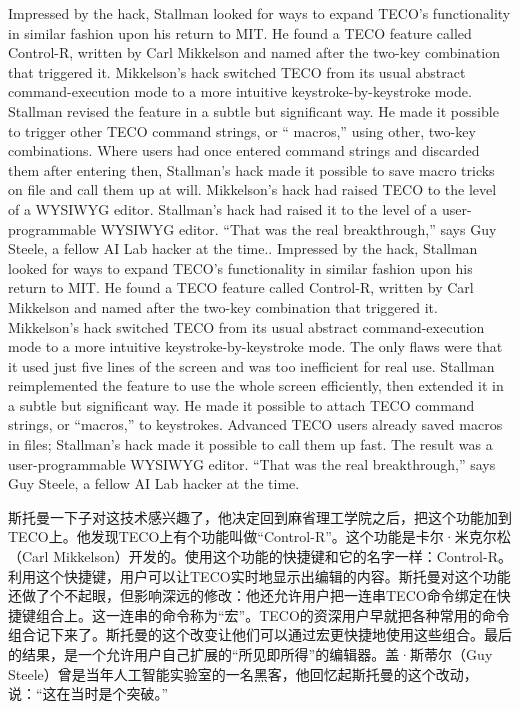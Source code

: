 \ifdefined\eng
\ifdefined\vone
Impressed by the hack, Stallman looked for ways to expand TECO's functionality in similar fashion upon his return to MIT. He found a TECO feature called Control-R, written by Carl Mikkelson and named after the two-key combination that triggered it. Mikkelson's hack switched TECO from its usual abstract command-execution mode to a more intuitive keystroke-by-keystroke mode. Stallman revised the feature in a subtle but significant way. He made it possible to trigger other TECO command strings, or `` macros,'' using other, two-key combinations. Where users had once entered command strings and discarded them after entering then, Stallman's hack made it possible to save macro tricks on file and call them up at will. Mikkelson's hack had raised TECO to the level of a WYSIWYG editor. Stallman's hack had raised it to the level of a user-programmable WYSIWYG editor. ``That was the real breakthrough,'' says Guy Steele, a fellow AI Lab hacker at the time..
\fi
\ifdefined\vtwo
Impressed by the hack, Stallman looked for ways to expand TECO's functionality in similar fashion upon his return to MIT. He found a TECO feature called Control-R, written by Carl Mikkelson and named after the two-key combination that triggered it. Mikkelson's hack switched TECO from its usual abstract command-execution mode to a more intuitive keystroke-by-keystroke mode. The only flaws were that it used just five lines of the screen and was too inefficient for real use. Stallman reimplemented the feature to use the whole screen efficiently, then extended it in a subtle but significant way. He made it possible to attach TECO command strings, or ``macros,'' to keystrokes. Advanced TECO users already saved macros in files; Stallman's hack made it possible to call them up fast. The result was a user-programmable WYSIWYG editor. ``That was the real breakthrough,'' says Guy Steele, a fellow AI Lab hacker at the time.
\fi
\fi

\ifdefined\chs
\ifdefined\vone
斯托曼一下子对这技术感兴趣了，他决定回到麻省理工学院之后，把这个功能加到TECO上。他发现TECO上有个功能叫做``Control-R''。这个功能是卡尔·米克尔松（Carl Mikkelson）开发的。使用这个功能的快捷键和它的名字一样：Control-R。利用这个快捷键，用户可以让TECO实时地显示出编辑的内容。斯托曼对这个功能还做了个不起眼，但影响深远的修改：他还允许用户把一连串TECO命令绑定在快捷键组合上。这一连串的命令称为``宏''。TECO的资深用户早就把各种常用的命令组合记下来了。斯托曼的这个改变让他们可以通过宏更快捷地使用这些组合。最后的结果，是一个允许用户自己扩展的``所见即所得''的编辑器。盖·斯蒂尔（Guy Steele）曾是当年人工智能实验室的一名黑客，他回忆起斯托曼的这个改动，说：``这在当时是个突破。''

